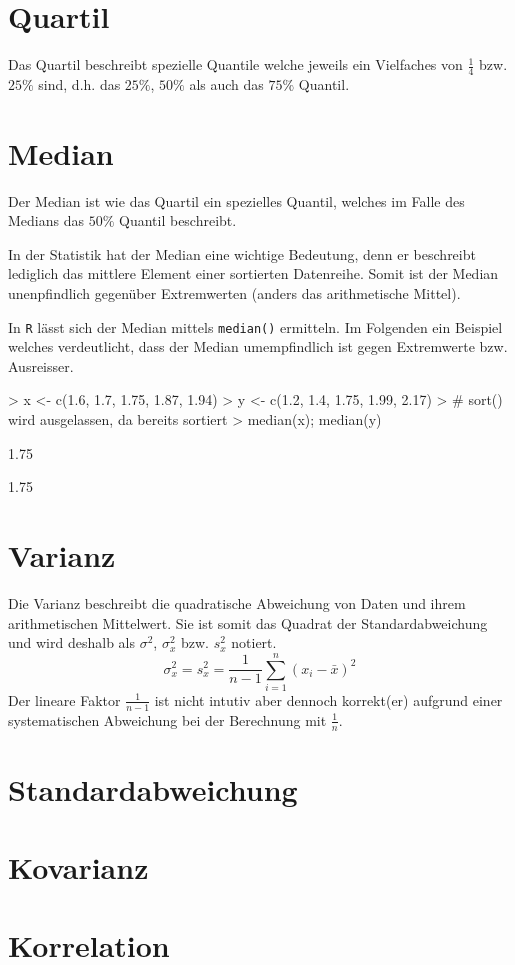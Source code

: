 \section{Quartil}
Das Quartil beschreibt spezielle Quantile welche jeweils ein
Vielfaches von $\frac{1}{4}$ bzw. $25\%$ sind, d.h. das
$25\%$, $50\%$ als auch das $75\%$ Quantil.

\section{Median}
Der Median ist wie das Quartil ein spezielles Quantil, welches im Falle
des Medians das $50\%$ Quantil beschreibt.

In der Statistik hat der Median eine wichtige Bedeutung, denn er 
beschreibt lediglich das mittlere Element einer sortierten Datenreihe.
Somit ist der Median unenpfindlich gegenüber Extremwerten (anders das
arithmetische Mittel).

In \lstinline{R} lässt sich der Median mittels \lstinline{median()}
ermitteln. Im Folgenden ein Beispiel welches verdeutlicht, dass der
Median umempfindlich ist gegen Extremwerte bzw. Ausreisser.
\begin{Schunk}
\begin{Sinput}
> x <- c(1.6, 1.7, 1.75, 1.87, 1.94)
> y <- c(1.2, 1.4, 1.75, 1.99, 2.17)
> # sort() wird ausgelassen, da bereits sortiert
> median(x); median(y)
\end{Sinput}
\begin{Soutput}
[1] 1.75
\end{Soutput}
\begin{Soutput}
[1] 1.75
\end{Soutput}
\end{Schunk}

\section{Varianz}
Die Varianz beschreibt die quadratische Abweichung von Daten und
ihrem arithmetischen Mittelwert. Sie ist somit das Quadrat der 
Standardabweichung und wird deshalb als $\sigma^2$, $\sigma_{x}^2$ 
bzw. $s_{x}^2$ notiert.
\[
	\sigma_{x}^2 
	= s_{x}^2 
	= \frac{1}{n-1} \sum_{i=1}^n (x_i - \bar{x})^2
\]
Der lineare Faktor $\frac{1}{n-1}$ ist nicht intutiv aber dennoch 
korrekt(er) aufgrund einer systematischen Abweichung bei der 
Berechnung mit $\frac{1}{n}$.

\section{Standardabweichung}

\section{Kovarianz}

\section{Korrelation}

